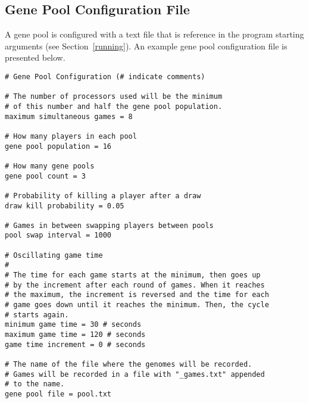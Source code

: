 \documentclass[letter]{article}
\renewcommand\_{\textunderscore\allowbreak}
\begin{document}
\subsection{Gene Pool Configuration File}
A gene pool is configured with a text file that is reference in the program starting arguments (see Section~\ref{running}). An example gene pool configuration file is presented below.
\begin{verbatim}
# Gene Pool Configuration (# indicate comments)

# The number of processors used will be the minimum
# of this number and half the gene pool population.
maximum simultaneous games = 8

# How many players in each pool
gene pool population = 16

# How many gene pools
gene pool count = 3

# Probability of killing a player after a draw
draw kill probability = 0.05

# Games in between swapping players between pools
pool swap interval = 1000

# Oscillating game time
#
# The time for each game starts at the minimum, then goes up
# by the increment after each round of games. When it reaches
# the maximum, the increment is reversed and the time for each
# game goes down until it reaches the minimum. Then, the cycle
# starts again.
minimum game time = 30 # seconds
maximum game time = 120 # seconds
game time increment = 0 # seconds

# The name of the file where the genomes will be recorded.
# Games will be recorded in a file with "_games.txt" appended
# to the name.
gene pool file = pool.txt
\end{verbatim}
\end{document}
